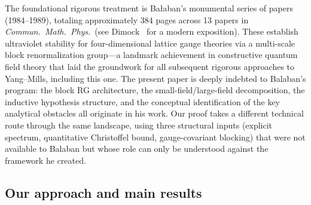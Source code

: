 \documentclass[11pt]{article}
\theoremstyle{definition}
\begin{document}
The foundational rigorous treatment is Ba\l aban's monumental series
of papers~\cite{BalabanI,BalabanII,BalabanIII,BalabanLF1,BalabanLF2}
(1984--1989), totaling approximately 384 pages across 13 papers in
\emph{Commun.\ Math.\ Phys.}\ (see Dimock~\cite{DimockI,DimockII}
for a modern exposition).  These establish ultraviolet stability for
four-dimensional lattice gauge theories via a multi-scale block
renormalization group---a landmark achievement in constructive
quantum field theory that laid the groundwork for all subsequent
rigorous approaches to Yang--Mills, including this one.
The present paper is deeply indebted to Balaban's program:
the block RG architecture, the small-field/large-field decomposition,
the inductive hypothesis structure, and the conceptual identification
of the key analytical obstacles all originate in his work.
Our proof takes a different technical route through the same
landscape, using three structural inputs (explicit spectrum,
quantitative Christoffel bound, gauge-covariant blocking)
that were not available to Balaban but whose role
can only be understood against the framework he created.

\subsection{Our approach and main results}
\end{document}
